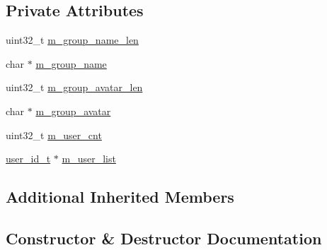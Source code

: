 \subsection*{Private Attributes}
\begin{DoxyCompactItemize}
\item 
uint32\+\_\+t \hyperlink{class_c_im_pdu_client_group_create_tmp_group_request_ac30eb51860c0a1a62c3f27c6313b15bd}{m\+\_\+group\+\_\+name\+\_\+len}
\item 
char $\ast$ \hyperlink{class_c_im_pdu_client_group_create_tmp_group_request_a8f13a14c6bdba2ef0aff96a5f20dfcac}{m\+\_\+group\+\_\+name}
\item 
uint32\+\_\+t \hyperlink{class_c_im_pdu_client_group_create_tmp_group_request_a9e64602569cb7ac4f79df63cca12eb96}{m\+\_\+group\+\_\+avatar\+\_\+len}
\item 
char $\ast$ \hyperlink{class_c_im_pdu_client_group_create_tmp_group_request_aebd5b21c098a58cf5388e480bc8a87b2}{m\+\_\+group\+\_\+avatar}
\item 
uint32\+\_\+t \hyperlink{class_c_im_pdu_client_group_create_tmp_group_request_a3f9f4989ad7bf9c0a4712d28b97051cc}{m\+\_\+user\+\_\+cnt}
\item 
\hyperlink{structuser__id__t}{user\+\_\+id\+\_\+t} $\ast$ \hyperlink{class_c_im_pdu_client_group_create_tmp_group_request_af523d0ff54157c1f45d8876e958c2f6f}{m\+\_\+user\+\_\+list}
\end{DoxyCompactItemize}
\subsection*{Additional Inherited Members}


\subsection{Constructor \& Destructor Documentation}
\hypertarget{class_c_im_pdu_client_group_create_tmp_group_request_a620ca380783e284af471c8de60d3cf76}{}
